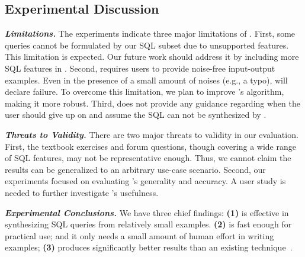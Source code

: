 \vspace{-1mm}
\subsection{Experimental Discussion}
\vspace{-1mm}

\enlargethispage{5pt}

\noindent \textbf{\textit{Limitations.}}
The experiments indicate three major limitations
of \ourtool. First, some queries
cannot be formulated by our SQL subset
due to unsupported features. This limitation is expected.
Our future work
should address it by including more SQL
features in \ourtool. Second, \ourtool requires
users to provide noise-free input-output examples.
Even in the presence of a small amount of 
noises (e.g., a typo), \ourtool will declare failure.
To overcome this limitation, we plan to improve \ourtool
's algorithm, making it more robust. Third,
\ourtool does not provide any guidance regarding
when the user should give up on \ourtool and assume
the SQL can not be synthesized by \ourtool.

\vspace{.5mm}
\noindent \textbf{\textit{Threats to Validity.}}
There are two major threats to validity
in our evaluation. First, the \exnum textbook exercises
and \pnum forum questions, though covering
a wide range of SQL features, may not be representative enough.
Thus, we cannot claim the results can be generalized to an
arbitrary use-case scenario. Second, our
experiments focused on evaluating \ourtool's generality 
and accuracy. A user study is needed to further investigate
\ourtool's usefulness.


\vspace{.5mm}
\noindent \textbf{\textit{Experimental Conclusions.}}
We have three chief findings: \textbf{(1)}
\ourtool is effective in synthesizing SQL queries
from relatively small examples.
\textbf{(2)} \ourtool is fast enough for practical use;
and it only needs a small amount of human
effort in writing examples;
\textbf{(3)} \ourtool produces significantly better results
than an existing technique~\cite{Tran:2009}.





